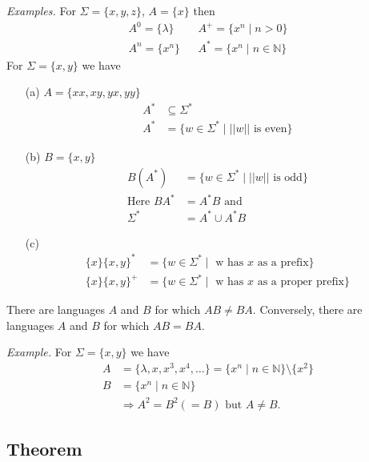 \documentclass[11pt]{article}
\begin{document}
    \emph{Examples.} For \(\Sigma = \{x,y,z\}\), \(A = \{x\}\) then
    \begin{align*}
        A^0 = \{\lambda\} && A^+ = \{x^n \mid n > 0\} \\
        A^n = \{x^n\}     && A^* = \{x^n \mid n \in \mathbb{N}\}
    \end{align*}
    For \(\Sigma = \{x,y\}\) we have
    \begin{enumerate}
        \item[(a)] \(A = \{xx, xy, yx, yy\}\)
        \begin{align*}
            A^* &\subseteq \Sigma^* \\
            A^* &= \{w \in \Sigma^* \mid ||w|| \text{ is even}\}
        \end{align*}  

        \item[(b)] \(B = \{x,y\}\)
        \begin{align*}
            B(A^*) &= \{w \in \Sigma^* \mid ||w|| \text{ is odd}\} \\
            \text{Here } BA^* &= A^*B \text{ and} \\
            \Sigma^* &= A^* \cup A^*B
        \end{align*} 

        \item[(c)] \begin{align*}
            \{x\} \{x,y\}^* &= \{w \in \Sigma^* \mid \text{ w has $x$ as a prefix}\} \\
            \{x\} \{x,y\}^+ &= \{w \in \Sigma^* \mid \text{ w has $x$ as a proper prefix}\}
        \end{align*}
    \end{enumerate}
    There are languages $A$ and $B$ for which \(AB \neq BA\). Conversely, there are languages $A$ and $B$ for which \(AB = BA\).

    \vspace{1em}

    \emph{Example.} For \(\Sigma = \{x,y\}\) we have
    \begin{align*}
        A &= \{\lambda, x, x^3, x^4, \dots\} = \{x^n \mid n \in \mathbb{N}\} \setminus \{x^2\} \\
        B &= \{x^n \mid n \in \mathbb{N}\} \\
        &\Rightarrow A^2 = B^2 (=B) \text{ but } A \neq B.
    \end{align*}

    \subsection{Theorem}
\end{document}
